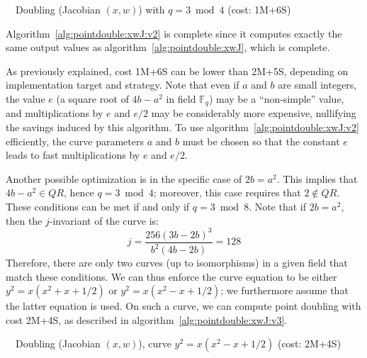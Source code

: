 \documentclass{llncs}
\newcommand{\QR}{QR}
\newcommand{\bF}{\mathbb{F}}
\begin{document}
\begin{algorithm}[H]
    \caption{\ \ Doubling (Jacobian $(x,w)$) with $q = 3\bmod 4$ (cost: 1M+6S)}\label{alg:pointdouble:xwJ:v2}
    \begin{algorithmic}[1]
    \end{algorithmic}
\end{algorithm}

Algorithm~\ref{alg:pointdouble:xwJ:v2} is complete since it computes
exactly the same output values as algorithm~\ref{alg:pointdouble:xwJ},
which is complete.

As previously explained, cost 1M+6S can be lower than 2M+5S, depending
on implementation target and strategy. Note that even if $a$ and $b$ are
small integers, the value $e$ (a square root of $4b-a^2$ in field
$\bF_q$) may be a ``non-simple'' value, and multiplications by $e$ and
$e/2$ may be considerably more expensive, nullifying the savings induced
by this algorithm. To use algorithm~\ref{alg:pointdouble:xwJ:v2}
efficiently, the curve parameters $a$ and $b$ must be chosen so that the
constant $e$ leads to fast multiplications by $e$ and $e/2$.

Another possible optimization is in the specific case of $2b = a^2$.
This implies that $4b - a^2 \in \QR$, hence $q = 3\bmod 4$; moreover,
this case requires that $2\notin \QR$. These conditions can be met if
and only if $q = 3\bmod 8$. Note that if $2b = a^2$, then the
$j$-invariant of the curve is:
\begin{equation*}
    j = \frac{256(3b - 2b)^3}{b^2(4b - 2b)} = 128
\end{equation*}
Therefore, there are only two curves (up to isomorphisms) in a given
field that match these conditions. We can thus enforce the curve equation
to be either $y^2 = x(x^2 + x + 1/2)$ or $y^2 = x(x^2 - x + 1/2)$; we
furthermore assume that the latter equation is used. On such a curve, we
can compute point doubling with cost 2M+4S, as described in
algorithm~\ref{alg:pointdouble:xwJ:v3}.

\begin{algorithm}[H]
    \caption{\ \ Doubling (Jacobian $(x,w)$), curve $y^2 = x(x^2 - x + 1/2)$ (cost: 2M+4S)}\label{alg:pointdouble:xwJ:v3}
    \begin{algorithmic}[1]
    \end{algorithmic}
\end{algorithm}
\end{document}
